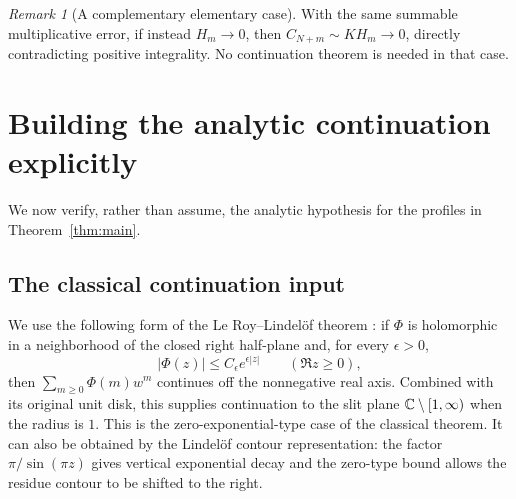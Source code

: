 \documentclass[11pt,a4paper]{article}
\theoremstyle{remark}\newtheorem{remark}[theorem]{Remark}
\begin{document}
\begin{remark}[A complementary elementary case]\label{rem:decay}
With the same summable multiplicative error, if instead $H_m\to0$, then
$C_{N+m}\sim KH_m\to0$, directly contradicting positive integrality.
No continuation theorem is needed in that case.
\end{remark}

\section{Building the analytic continuation explicitly}
We now verify, rather than assume, the analytic hypothesis for the profiles in
Theorem~\ref{thm:main}.

\subsection{The classical continuation input}
We use the following form of the Le Roy--Lindel\"of theorem
\cite[Introduction]{leroy}: if $\Phi$ is holomorphic in a neighborhood of the
closed right half-plane and, for every $\epsilon>0$,
\[
 |\Phi(z)|\le C_\epsilon e^{\epsilon|z|}\qquad(\Re z\ge0),
\]
then $\sum_{m\ge0}\Phi(m)w^m$ continues off the nonnegative real axis.
Combined with its original unit disk, this supplies continuation to the slit
plane $\mathbb C\setminus[1,\infty)$ when the radius is $1$.
This is the zero-exponential-type case of the classical theorem.
It can also be obtained by the Lindel\"of contour representation: the factor
$\pi/\sin(\pi z)$ gives vertical exponential decay and the zero-type bound
allows the residue contour to be shifted to the right.
\end{document}
